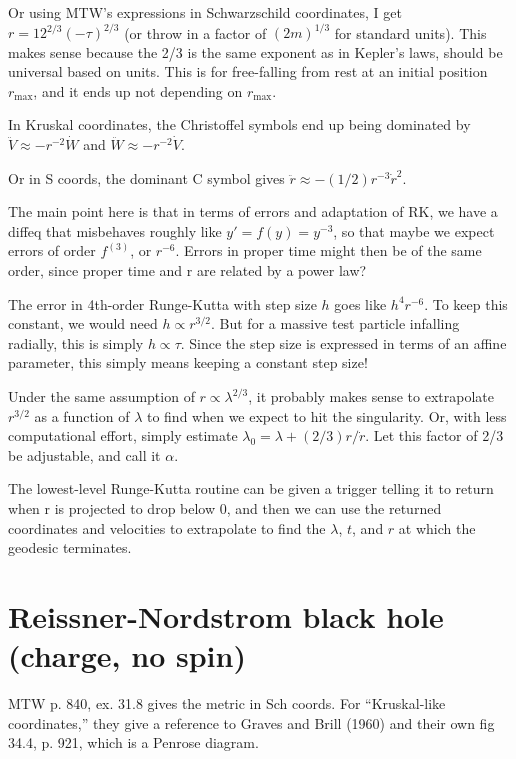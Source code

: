 \documentclass{article}
\begin{document}
Or using MTW's expressions in Schwarzschild coordinates, I get
$r=12^{2/3}(-\tau)^{2/3}$ (or throw in a factor of $(2m)^{1/3}$ for
standard units). This makes sense because the 2/3 is the same exponent
as in Kepler's laws, should be universal based on units. This is for free-falling
from rest at an initial position $r_\text{max}$, and it ends up not depending
on $r_\text{max}$.

In Kruskal coordinates, the Christoffel symbols end up being dominated by
$\ddot{V}\approx -r^{-2}\dot{W}$ and $\ddot{W}\approx -r^{-2}\dot{V}$.

Or in S coords, the dominant C symbol gives $\ddot{r}\approx -(1/2)r^{-3}\dot{r}^2$.

The main point here is that in terms of errors and adaptation of RK,
we have a diffeq that misbehaves roughly like $y'=f(y)=y^{-3}$, so that
maybe we expect errors of order $f^{(3)}$, or $r^{-6}$. Errors in proper
time might then be of the same order, since proper time and r are related
by a power law?

The error in 4th-order Runge-Kutta with step size $h$ goes like $h^4r^{-6}$.
To keep this constant, we would need $h\propto r^{3/2}$. But for a massive
test particle infalling radially, this is simply $h\propto \tau$. Since the
step size is expressed in terms of an affine parameter, this simply means
keeping a constant step size!

Under the same assumption of $r\propto\lambda^{2/3}$, it probably makes sense
to extrapolate $r^{3/2}$ as a function of $\lambda$ to find when we expect
to hit the singularity. Or, with less computational effort, simply estimate
$\lambda_0=\lambda+(2/3)r/\dot{r}$. Let this factor of 2/3 be adjustable, and
call it $\alpha$.

The lowest-level Runge-Kutta routine can be given a trigger telling it to
return when r is projected to drop below 0, and then we can use the returned
coordinates and velocities to extrapolate to find the $\lambda$, $t$, and $r$
at which the geodesic terminates.

\section{Reissner-Nordstrom black hole (charge, no spin)}

MTW p. 840, ex. 31.8 gives the metric in Sch coords. For ``Kruskal-like coordinates,''
they give a reference to Graves and Brill (1960) and their own fig 34.4, p. 921,
which is a Penrose diagram.
\end{document}
